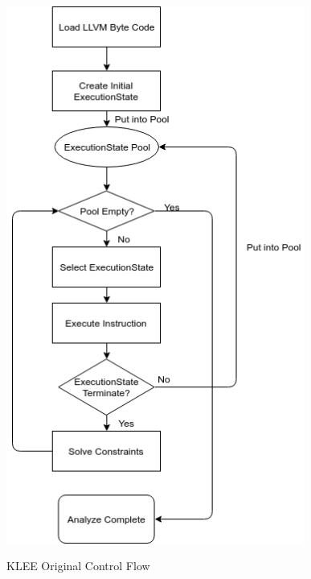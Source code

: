 \begin{figure}%
\begin{center}
{\mbox{\includegraphics[height=500pt]{figures/klee_control_flow.png}}}
\end{center}
\caption{\label{klee_control_flow}KLEE Original Control Flow}
\end{figure}


